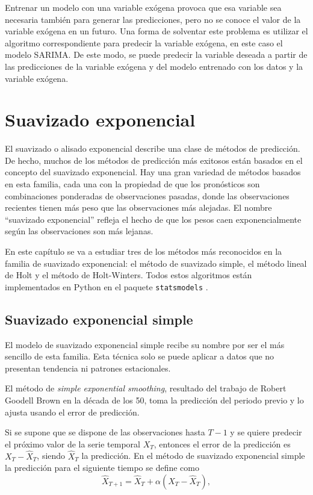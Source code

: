 \documentclass[12pt,twoside]{article}
\begin{document}
Entrenar un modelo con una variable exógena provoca que esa variable sea necesaria también para generar las predicciones, pero no se conoce el valor de la variable exógena en un futuro. Una forma de solventar este problema es utilizar el algoritmo correspondiente para predecir la variable exógena, en este caso el modelo SARIMA. De este modo, se puede predecir la variable deseada a partir de las predicciones de la variable exógena y del modelo entrenado con los datos y la variable exógena.







\newpage
\section{Suavizado exponencial}

El suavizado o alisado exponencial describe una clase de métodos de predicción. De hecho, muchos de los métodos de predicción más exitosos están basados en el concepto del suavizado exponencial. Hay una gran variedad de métodos basados en esta familia, cada una con la propiedad de que los pronósticos son combinaciones ponderadas de observaciones pasadas, donde las observaciones recientes tienen  más peso que las observaciones más alejadas. El nombre ``suavizado exponencial'' refleja el hecho de que los pesos caen exponencialmente según las observaciones son más lejanas.

En este capítulo se va a estudiar tres de los métodos más reconocidos en la familia de suavizado exponencial: el método de suavizado simple, el método lineal de Holt y el método de Holt-Winters. Todos estos algoritmos están implementados en Python en el paquete \texttt{statsmodels} \cite{ES4}.




\subsection{Suavizado exponencial simple}
El modelo de suavizado exponencial simple recibe su nombre por ser el más sencillo de esta familia. Esta técnica solo se puede aplicar a datos que no presentan tendencia ni patrones estacionales. 

El método de \textit{simple exponential smoothing}, resultado del trabajo de Robert Goodell Brown \cite{ES1} en la década de los 50, toma la predicción del periodo previo y lo ajusta usando el error de predicción.

Si se supone que se dispone de las observaciones hasta $T-1$ y se quiere predecir el próximo valor de la serie temporal $X_T$, entonces el error de la predicción es $X_T - \hat{X}_T$, siendo $\hat{X}_T$ la predicción. En el método de suavizado exponencial simple la predicción para el siguiente tiempo se define como
\begin{equation} \label{eq:simple_exp}
   \hat{X}_{T+1} = \hat{X}_T + \alpha (X_T - \hat{X}_T), 
\end{equation}
\end{document}
